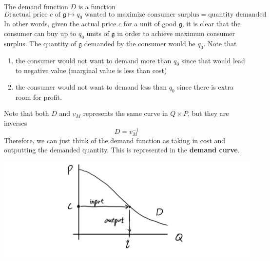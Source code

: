 \documentclass{article}
\begin{document}
    \begin{definition}
      The demand function $D$ is a function
      \[D: \text{actual price } c \text{ of } \mathfrak{g} \mapsto q_0 \text{ wanted to maximize consumer surplus}=\text{quantity demanded} \]
      In other words, given the actual price $c$ for a unit of good $\mathfrak{g}$, it is clear that the consumer can buy up to $q_0$ units of $\mathfrak{g}$ in order to achieve maximum consumer surplus. The quantity of $\mathfrak{g}$ demanded by the consumer would be $q_0$. Note that
      \begin{enumerate}
        \item the consumer would not want to demand more than $q_0$ since that would lead to negative value (marginal value is less than cost) 
        \item the consumer would not want to demand less than $q_0$ since there is extra room for profit.  
      \end{enumerate}

      Note that both $D$ and $v_M$ represents the same curve in $Q \times P$, but they are inverses
      \[D = v_M^{-1}\]
      Therefore, we can just think of the demand function as taking in cost and outputting the demanded quantity. This is represented in the \textbf{demand curve}. 
      \begin{center}
        \includegraphics[scale=0.25]{img/Demand_Curve.PNG}
      \end{center}
    \end{definition}
\end{document}
